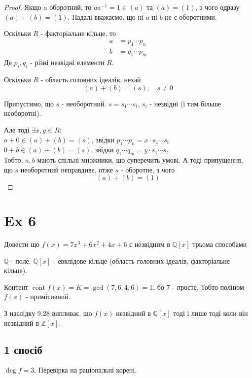 \documentclass[11pt, a4paper]{article} %
\newcommand{\Z}{\mathbb{Z}}
\newcommand{\Q}{\mathbb{Q}}
\begin{document}
\begin{proof}
    
    Якщо $a$ оборотний, то $aa^{-1}=1 \in (a)$ та $(a)=(1)$, з чого одразу $(a)+(b)=(1)$.
    Надалі вважаємо, що ні $a$ ні $b$ не є оборотними.
    
    Оскільки $R$ - факторіальне кільце, то 
    \begin{align*}
        a &= p_1 \cdots p_n\\
        b &= q_1 \cdots p_m
    \end{align*}
    Де $p_i,q_i$ - різні незвідні елементи $R$.
    
    Оскільки $R$ - область головних ідеалів, нехай
    \[(a) + (b) = (s), \quad s \ne 0\]
    
    Припустимо, що $s$ - необоротний.
    $s = s_1\cdots s_t$, $s_i$ - незвідні (і тим більше необоротні).
    
    Але тоді $\exists x,y\in R:$\\
    $a+0 \in (a) + (b) = (s)$, звідки $p_1\cdots p_n = x \cdot s_1\cdots s_t$\\
    $0+b \in (a) + (b) = (s)$, звідки $q_1\cdots q_m = y \cdot s_1\cdots s_t$\\
    
    Тобто, $a,b$ мають спільні множники, що суперечить умові.
    А тоді припущення, що $s$ необоротний неправдиве, отже $s$ - оборотне, з чого
    \[(a) + (b) = (1)\]
\end{proof}

\newpage
\section*{Ex 6}
\begin{mdframed}
    Довести що $f(x) = 7x^3 + 6x^2 + 4x + 6$ є незвідним в $\Q[x]$ трьома способами
\end{mdframed}

$\Q$ - поле.
$\Q[x]$ - евклідове кільце (область головних ідеалів, факторіальне кільце).

Контент $\operatorname{cont} f(x) = K = \gcd(7,6,4,6) = 1$, бо 7 - просте. 
Тобто поліном $f(x)$ - примітивний.   

З наслідку 9.28 випливає, що $f(x)$ незвідний в $\Q[x]$ тоді і лише тоді коли він незвідний в $\Z[x]$.

\subsection*{1 спосіб}
$\deg f = 3$. Перевірка на раціональні корені.
\end{document}
